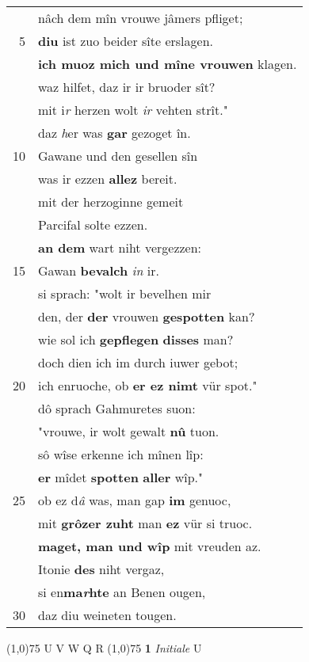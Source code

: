 \documentclass[8pt,a4paper,notitlepage]{article}
\begin{document}
\begin{table}[ht]
\begin{minipage}[t]{0.5\linewidth}
\begin{tabular}{rl}
 & nâch dem mîn vrouwe jâmers pfliget;\\ 
5 & \textbf{diu} ist zuo beider sîte erslagen.\\ 
 & \textbf{ich muoz mich und mîne vrouwen} klagen.\\ 
 & waz hilfet, daz ir ir bruoder sît?\\ 
 & mit i\textit{r} herzen wolt \textit{ir} vehten strît."\\ 
 & daz \textit{h}er was \textbf{gar} gezoget în.\\ 
10 & Gawane und den gesellen sîn\\ 
 & was ir ezzen \textbf{allez} bereit.\\ 
 & mit der herzoginne gemeit\\ 
 & Parcifal solte ezzen.\\ 
 & \textbf{an dem} wart niht vergezzen:\\ 
15 & Gawan \textbf{bevalch} \textit{in} ir.\\ 
 & si sprach: "wolt ir bevelhen mir\\ 
 & den, der \textbf{der} vrouwen \textbf{gespotten} kan?\\ 
 & wie sol ich \textbf{gepflegen} \textbf{disses} man?\\ 
 & doch dien ich im durch iuwer gebot;\\ 
20 & ich enruoche, ob \textbf{er ez nimt} vür spot."\\ 
 & dô sprach Gahmuretes suon:\\ 
 & "vrouwe, ir wolt gewalt \textbf{nû} tuon.\\ 
 & sô wîse erkenne ich mînen lîp:\\ 
 & \textbf{er} mîdet \textbf{spotten} \textbf{aller} wîp."\\ 
25 & ob ez d\textit{â} was, man gap \textbf{im} genuoc,\\ 
 & mit \textbf{grôzer zuht} man \textbf{ez} vür si truoc.\\ 
 & \textbf{maget, man und wîp} mit vreuden az.\\ 
 & Itonie \textbf{des} niht vergaz,\\ 
 & si en\textbf{ma\textit{r}hte} an Benen ougen,\\ 
30 & daz diu weineten tougen.\\ 
\end{tabular}
\scriptsize
\line(1,0){75} \newline
U V W Q R \newline
\line(1,0){75} \newline
\textbf{1} \textit{Initiale} U  \newline

\end{minipage}
\end{table}
\end{document}
